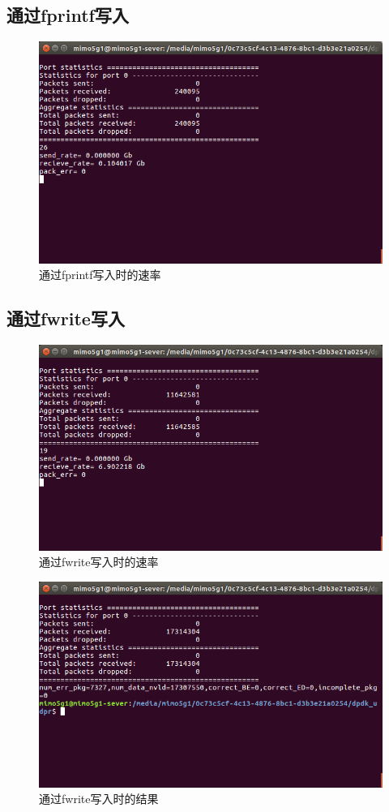 \documentclass{article}
\begin{document}
\subsection{通过fprintf写入}
\begin{figure}[H]
	\centering
	\includegraphics[width = .8\textwidth]{fprintfrate.png}
	\caption{通过fprintf写入时的速率}
\end{figure}
\subsection{通过fwrite写入}
\begin{figure}[H]
	\centering
	\includegraphics[width = .8\textwidth]{fwriterate.png}
	\caption{通过fwrite写入时的速率}
\end{figure}
\begin{figure}[H]
	\centering
	\includegraphics[width = .8\textwidth]{fwriteres.png}
	\caption{通过fwrite写入时的结果}
\end{figure}
\end{document}

